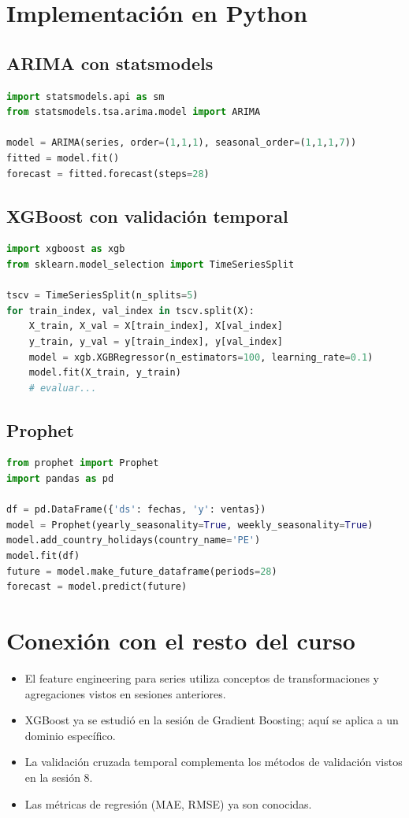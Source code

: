 \documentclass[12pt,a4paper,openany,oneside]{book}
\begin{document}
\section{Implementación en Python}

\subsection{ARIMA con statsmodels}
\begin{lstlisting}[language=Python]
import statsmodels.api as sm
from statsmodels.tsa.arima.model import ARIMA

model = ARIMA(series, order=(1,1,1), seasonal_order=(1,1,1,7))
fitted = model.fit()
forecast = fitted.forecast(steps=28)
\end{lstlisting}

\subsection{XGBoost con validación temporal}
\begin{lstlisting}[language=Python]
import xgboost as xgb
from sklearn.model_selection import TimeSeriesSplit

tscv = TimeSeriesSplit(n_splits=5)
for train_index, val_index in tscv.split(X):
    X_train, X_val = X[train_index], X[val_index]
    y_train, y_val = y[train_index], y[val_index]
    model = xgb.XGBRegressor(n_estimators=100, learning_rate=0.1)
    model.fit(X_train, y_train)
    # evaluar...
\end{lstlisting}

\subsection{Prophet}
\begin{lstlisting}[language=Python]
from prophet import Prophet
import pandas as pd

df = pd.DataFrame({'ds': fechas, 'y': ventas})
model = Prophet(yearly_seasonality=True, weekly_seasonality=True)
model.add_country_holidays(country_name='PE')
model.fit(df)
future = model.make_future_dataframe(periods=28)
forecast = model.predict(future)
\end{lstlisting}

\section{Conexión con el resto del curso}
\begin{itemize}
    \item El feature engineering para series utiliza conceptos de transformaciones y agregaciones vistos en sesiones anteriores.
    \item XGBoost ya se estudió en la sesión de Gradient Boosting; aquí se aplica a un dominio específico.
    \item La validación cruzada temporal complementa los métodos de validación vistos en la sesión 8.
    \item Las métricas de regresión (MAE, RMSE) ya son conocidas.
\end{itemize}
\end{document}
